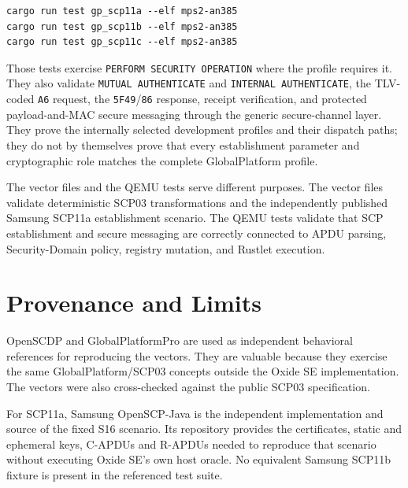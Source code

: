 \begin{verbatim}
cargo run test gp_scp11a --elf mps2-an385
cargo run test gp_scp11b --elf mps2-an385
cargo run test gp_scp11c --elf mps2-an385
\end{verbatim}

Those tests exercise \texttt{PERFORM SECURITY OPERATION} where the profile
requires it. They also validate \texttt{MUTUAL AUTHENTICATE} and
\texttt{INTERNAL AUTHENTICATE}, the TLV-coded \texttt{A6} request, the
\texttt{5F49}/\texttt{86} response, receipt verification, and protected
payload-and-MAC secure messaging through the generic secure-channel layer. They prove
the internally selected development profiles and their dispatch paths; they do
not by themselves prove that every establishment parameter and cryptographic
role matches the complete GlobalPlatform profile.

The vector files and the QEMU tests serve different purposes. The vector files
validate deterministic SCP03 transformations and the independently published
Samsung SCP11a establishment scenario. The QEMU tests
validate that SCP establishment and secure messaging are correctly connected to
APDU parsing, Security-Domain policy, registry mutation, and Rustlet execution.

\section{Provenance and Limits}

OpenSCDP and GlobalPlatformPro are used as independent behavioral references
for reproducing the vectors. They are valuable because they exercise the same
GlobalPlatform/SCP03 concepts outside the Oxide SE implementation. The vectors
were also cross-checked against the public SCP03 specification.

For SCP11a, Samsung OpenSCP-Java is the independent implementation and source
of the fixed S16 scenario. Its repository provides the certificates, static
and ephemeral keys, C-APDUs and R-APDUs needed to reproduce that scenario
without executing Oxide SE's own host oracle. No equivalent Samsung SCP11b
fixture is present in the referenced test suite.

